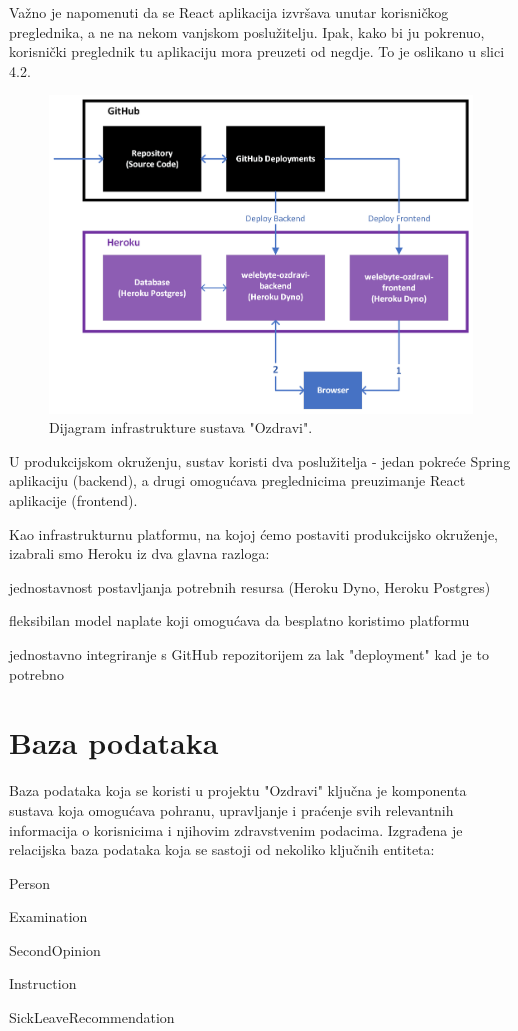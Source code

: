 		Važno je napomenuti da se React aplikacija izvršava unutar korisničkog preglednika, a ne na nekom vanjskom poslužitelju. Ipak, kako bi ju pokrenuo, korisnički preglednik tu aplikaciju mora preuzeti od negdje. To je oslikano u slici 4.2. 

		\begin{figure}[H]
			\includegraphics[width=\textwidth]{slike/infrastructure.png} 
			\caption{Dijagram infrastrukture sustava "Ozdravi".}
		\end{figure}

		U produkcijskom okruženju, sustav koristi dva poslužitelja - jedan pokreće Spring aplikaciju (backend), a drugi omogućava preglednicima preuzimanje React aplikacije (frontend).

		Kao infrastrukturnu platformu, na kojoj ćemo postaviti produkcijsko okruženje, izabrali smo Heroku iz dva glavna razloga:
		\begin{packed_item}
			\item jednostavnost postavljanja potrebnih resursa (Heroku Dyno, Heroku Postgres)
			\item fleksibilan model naplate koji omogućava da besplatno koristimo platformu
			\item jednostavno integriranje s GitHub repozitorijem za lak "deployment" kad je to potrebno
		\end{packed_item}
					
		\section{Baza podataka}
        Baza podataka koja se koristi u projektu "Ozdravi" ključna je komponenta sustava koja omogućava pohranu, upravljanje i praćenje svih relevantnih informacija o korisnicima i njihovim zdravstvenim podacima. 
		Izgrađena je relacijska baza podataka koja se sastoji od nekoliko ključnih entiteta:
		\begin{packed_item}
			\item Person
			\item Examination
			\item SecondOpinion
			\item Instruction
			\item SickLeaveRecommendation
		\end{packed_item}

